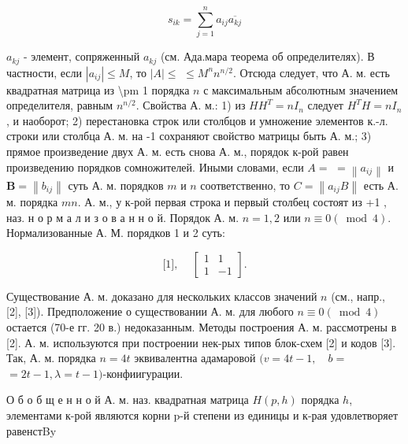 \documentclass[10pt]{article}
\begin{document}
\[

s_{i k}=\sum_{j=1}^{n} a_{i j} \overline{a_{k j}}

\]



$a_{k j}$ - элемент, сопряженный $a_{k j}$ (см. Ада.мара теорема об определителях). В частности, если $\left|a_{i j}\right| \leqslant M$, то $|A| \leqslant$ $\leqslant M^{n} n^{n / 2}$. Отсюда следует, что А. м. есть квадратная матрица из \textbackslash pm 1 порядка $n$ с максимальным абсолютным значением определителя, равным $n^{n / 2}$. Свойства А. м.: 1) из $H H^{T}=n I_{n}$ следует $H^{T} H=n I_{n}$, и наоборот; 2) перестановка строк или столбцов и умножение элементов к.-л. строки или столбца А. м. на -1 сохраняют свойство матрицы быть А. м.; 3) прямое произведение двух А. м. есть снова А. м., порядок к-рой равен произведению порядков сомножителей. Иными словами, если $A=$ $=\left\|a_{i j}\right\|$ и $\boldsymbol{B}=\left\|b_{i j}\right\|$ суть А. м. порядков $m$ и $n$ соответственно, то $C=\left\|a_{i j} B\right\|$ есть А. м. порядка $m n$. А. м., у к-рой первая строка и первый столбец состоят из +1 , наз. н о р м а л и з о в а н н о й. Порядок А. м. $n=1,2$ или $n \equiv 0(\bmod 4)$. Нормализованные А. М. порядков 1 и 2 суть:



\[

\text { [1], } \quad\left[\begin{array}{rr}

1 & 1 \\

1 & -1

\end{array}\right] \text {. }

\]



Существование А. м. доказано для нескольких классов значений $n$ (см., напр., [2], [3]). Предположение о существовании А. м. для любого $n \equiv 0(\bmod 4)$ остается (70-е гг. 20 в.) недоказанным. Методы построения А. м. рассмотрены в [2]. А. м. используются при построении нек-рых типов блок-схем [2] и кодов [3]. Так, А. м. порядка $n=4 t$ эквивалентна адамаровой $(v=4 t-1, \quad b=$ $=2 t-1, \lambda=t-1)$-конфиигурации.



О б о б щ е н н о й А. м. наз. квадратная матрица $H(p, h)$ порядка $h$, элементами к-рой являются корни p-й степени из единицы и к-рая удовлетворяет равенстBy
\end{document}
